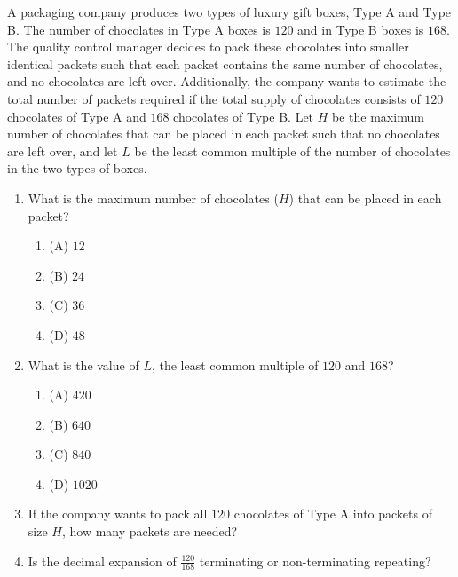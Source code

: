 \documentclass[12pt,a4paper]{exam}
\begin{document}
\begin{questions}
\question[4] A packaging company produces two types of luxury gift boxes, Type A and Type B. The number of chocolates in Type A boxes is $120$ and in Type B boxes is $168$. The quality control manager decides to pack these chocolates into smaller identical packets such that each packet contains the same number of chocolates, and no chocolates are left over. Additionally, the company wants to estimate the total number of packets required if the total supply of chocolates consists of $120$ chocolates of Type A and $168$ chocolates of Type B. Let $H$ be the maximum number of chocolates that can be placed in each packet such that no chocolates are left over, and let $L$ be the least common multiple of the number of chocolates in the two types of boxes.
\vspace{0.2cm}
\begin{enumerate}[label=(\roman*)]
  \item What is the maximum number of chocolates ($H$) that can be placed in each packet?
  \begin{enumerate}[label=(\Alph*)]
    \item (A) $12$
    \item (B) $24$
    \item (C) $36$
    \item (D) $48$
  \end{enumerate}
  \item What is the value of $L$, the least common multiple of $120$ and $168$?
  \begin{enumerate}[label=(\Alph*)]
    \item (A) $420$
    \item (B) $640$
    \item (C) $840$
    \item (D) $1020$
  \end{enumerate}
  \item If the company wants to pack all $120$ chocolates of Type A into packets of size $H$, how many packets are needed?
  \item Is the decimal expansion of $\frac{120}{168}$ terminating or non-terminating repeating?
\end{enumerate}
\vspace{0.15cm}


\end{questions}
\end{document}
